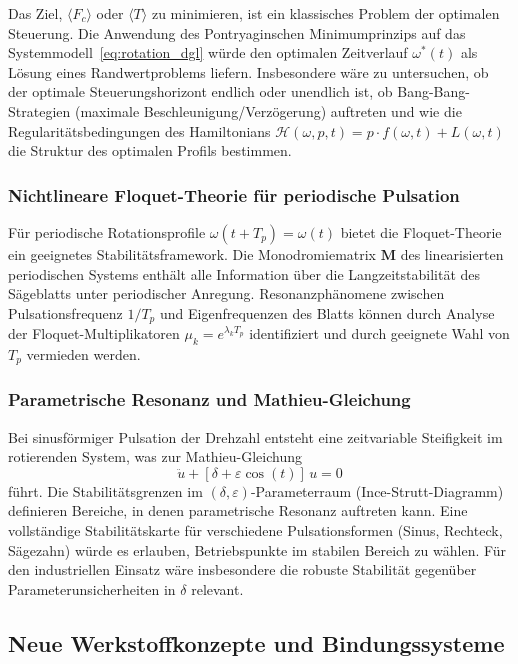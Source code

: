 ﻿\documentclass[a4paper,12pt]{article}
\theoremstyle{definition}
\begin{document}
Das Ziel, $\langle F_c \rangle$ oder $\langle T \rangle$ zu minimieren, ist ein
klassisches Problem der optimalen Steuerung. Die Anwendung des Pontryaginschen
Minimumprinzips auf das Systemmodell~\eqref{eq:rotation_dgl} würde den optimalen
Zeitverlauf $\omega^*(t)$ als Lösung eines Randwertproblems liefern. Insbesondere
wäre zu untersuchen, ob der optimale Steuerungshorizont endlich oder unendlich ist,
ob Bang-Bang-Strategien (maximale Beschleunigung/Verzögerung) auftreten und wie
die Regularitätsbedingungen des Hamiltonians $\mathcal{H}(\omega, p, t) = p \cdot f(\omega,t) + L(\omega,t)$
die Struktur des optimalen Profils bestimmen.

\subsubsection{Nichtlineare Floquet-Theorie für periodische Pulsation}

Für periodische Rotationsprofile $\omega(t+T_p) = \omega(t)$ bietet die Floquet-Theorie
ein geeignetes Stabilitätsframework. Die Monodromiematrix $\mathbf{M}$ des linearisierten
periodischen Systems enthält alle Information über die Langzeitstabilität des Sägeblatts
unter periodischer Anregung. Resonanzphänomene zwischen Pulsationsfrequenz $1/T_p$ und
Eigenfrequenzen des Blatts können durch Analyse der Floquet-Multiplikatoren
$\mu_k = e^{\lambda_k T_p}$ identifiziert und durch geeignete Wahl von $T_p$ vermieden werden.

\subsubsection{Parametrische Resonanz und Mathieu-Gleichung}

Bei sinusförmiger Pulsation der Drehzahl entsteht eine zeitvariable Steifigkeit
im rotierenden System, was zur Mathieu-Gleichung
\[
\ddot{u} + [\delta + \varepsilon\cos(t)]\,u = 0
\]
führt. Die Stabilitätsgrenzen im $(\delta, \varepsilon)$-Parameterraum (Ince-Strutt-Diagramm)
definieren Bereiche, in denen parametrische Resonanz auftreten kann.
Eine vollständige Stabilitätskarte für verschiedene Pulsationsformen (Sinus, Rechteck, Sägezahn)
würde es erlauben, Betriebspunkte im stabilen Bereich zu wählen. Für den industriellen Einsatz
wäre insbesondere die robuste Stabilität gegenüber Parameterunsicherheiten in $\delta$ relevant.

\subsection{Neue Werkstoffkonzepte und Bindungssysteme}
\end{document}
